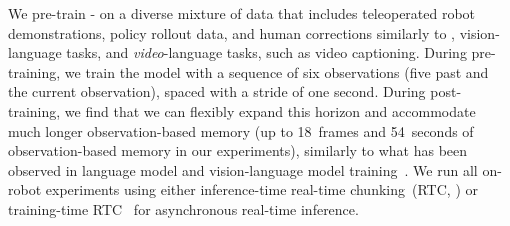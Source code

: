 We pre-train \pizerosix{}-\Acronym{} on a diverse mixture of data that includes teleoperated robot demonstrations, policy rollout data, and human corrections similarly to \citet{intelligence2025pi}, vision-language tasks, and \emph{video}-language tasks, such as video captioning.
During pre-training, we train the model with a sequence of six observations (five past and the current observation), spaced with a stride of one second.
During post-training, we find that we can flexibly expand this horizon and accommodate much longer observation-based memory (up to 18~frames and 54~seconds of observation-based memory in our experiments), similarly to what has been observed in language model and vision-language model training~\citep{chen2023extending}. 
We run all on-robot experiments using either inference-time real-time chunking~(RTC, \citep{black2025real}) or training-time RTC~\citep{black2025training} for asynchronous real-time inference.


























